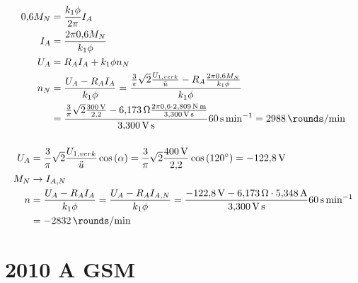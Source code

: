 \documentclass[11pt,a4paper]{scrartcl}
\newcommand{\mybr}[1]{\left(#1\right)}
\newcommand{\0}{_{\mybr{0}}}
\newcommand{\1}{_{\mybr{1}}}
\newcommand{\2}{_{\mybr{2}}}
\begin{document}
\section{}
\begin{align}
\num{0.6}M_N&=\frac{k_1\phi}{2\pi}I_A\\
I_A&=\frac{2\pi\num{0.6}M_N}{k_1\phi}\\
U_A&=R_A I_A + k_1\phi n_N\\
n_N&=\frac{U_A-R_A I_A}{k_1\phi}=\frac{\frac{3}{\pi}\sqrt{2}\frac{U_{1,verk}}{\ddot{u}}-R_A\frac{2\pi\num{0.6}M_N}{k_1\phi}}{k_1\phi}\\
&=\frac{\frac{3}{\pi}\sqrt{2}\frac{\SI{300}{\volt}}{\num{2.2}}-\SI{6.173}{\ohm}\frac{2\pi\num{0.6}\cdot\SI{2.809}{\newton\metre}}{\SI{3.300}{\volt\second}}}{\SI{3.300}{\volt\second}}\SI{60}{\second\per\minute}=\SI{2988}{\rounds\per\minute}
\end{align}

\section{}
\begin{align}
U_A&=\frac{3}{\pi}\sqrt{2}\frac{U_{1,verk}}{\ddot{u}}\cos\mybr{\alpha}=\frac{3}{\pi}\sqrt{2}\frac{\SI{400}{\volt}}{\num{2.2}}\cos\mybr{\SI{120}{\degree}}=\SI{-122.8}{\volt}\\
M_N&\rightarrow I_{A,N}\\
n&=\frac{U_A-R_A I_A}{k_1\phi}=\frac{U_A-R_A I_{A,N}}{k_1\phi}=\frac{\SI{-122.8}{\volt}-\SI{6.173}{\ohm}\cdot\SI{5.348}{\ampere}}{\SI{3.300}{\volt\second}}\SI{60}{\second\per\minute}\\
&=\SI{-2832}{\rounds\per\minute}
\end{align}

\clearpage
\part{2010 A GSM}
\end{document}

